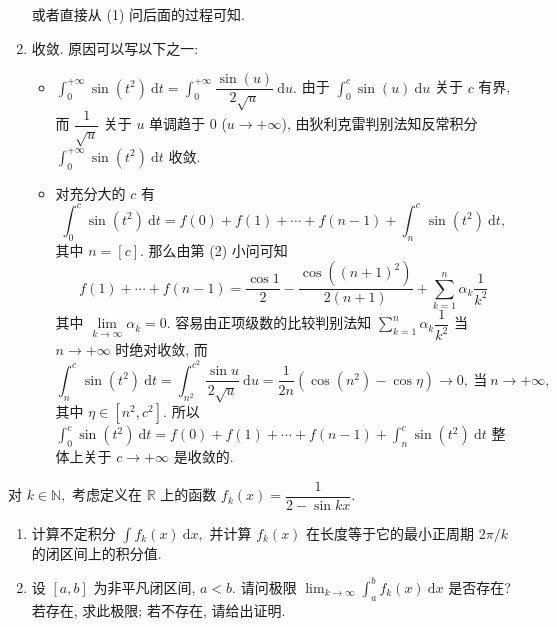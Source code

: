 \begin{solution}
\begin{enumerate}
或者直接从 (1) 问后面的过程可知.

\item 收敛. 原因可以写以下之一:
\begin{itemize}
\item[\ding{43}] $\displaystyle \int_0^{+\infty} \sin(t^2) ~ \mathrm{d}t = \int_0^{+\infty} \dfrac{\sin(u)}{2\sqrt{u}} ~ \mathrm{d}u.$ 由于 $\displaystyle \int_0^c \sin(u) ~ \mathrm{d}u$ 关于 $c$ 有界, 而 $\dfrac{1}{\sqrt{u}}$ 关于 $u$ 单调趋于 $0$ ($u \to + \infty$), 由狄利克雷判别法知反常积分 $\displaystyle \int_0^{+\infty} \sin(t^2) ~ \mathrm{d}t$ 收敛.

\item[\ding{43}] 对充分大的 $c$ 有
$$\int_0^c \sin(t^2) ~ \mathrm{d}t = f(0) + f(1) + \cdots + f(n-1) + \int_n^c \sin(t^2) ~ \mathrm{d}t,$$
其中 $n = [c].$ 那么由第 (2) 小问可知
\begin{equation*}
f(1) + \cdots + f(n-1) = \dfrac{\cos 1}{2} - \dfrac{\cos((n+1)^2)}{2(n+1)} + \sum_{k=1}^n \alpha_k \dfrac{1}{k^2}
\end{equation*}
其中 $\lim\limits_{k \to \infty} \alpha_k = 0.$ 容易由正项级数的比较判别法知 $\sum\limits_{k=1}^n \alpha_k \dfrac{1}{k^2}$ 当 $n \to +\infty$ 时绝对收敛, 而
\begin{equation*}
\int_n^c \sin(t^2) ~ \mathrm{d}t = \int_{n^2}^{c^2} \dfrac{\sin u}{2\sqrt{u}} ~ \mathrm{d} u = \dfrac{1}{2n} ( \cos (n^2) - \cos \eta) \to 0, ~ \text{当} ~ n \to +\infty,
\end{equation*}
其中 $\eta \in [n^2, c^2].$ 所以 $\displaystyle \int_0^c \sin(t^2) ~ \mathrm{d}t = f(0) + f(1) + \cdots + f(n-1) + \int_n^c \sin(t^2) ~ \mathrm{d}t$ 整体上关于 $c \to +\infty$ 是收敛的.
\end{itemize}
\end{enumerate}
\end{solution}


\begin{question}[points = 12]
对 $k \in \mathbb{N},$ 考虑定义在 $\mathbb{R}$ 上的函数 $\displaystyle f_k(x) = \dfrac{1}{2 - \sin kx}.$
\begin{enumerate}
\item 计算不定积分 $\displaystyle \int f_k(x) ~ \mathrm{d} x,$ 并计算 $f_k(x)$ 在长度等于它的最小正周期 $2\pi/k$ 的闭区间上的积分值.
\item 设 $[a, b]$ 为非平凡闭区间, $a < b.$ 请问极限 $\displaystyle \lim_{k\to\infty} \int_a^b f_k(x) ~ \mathrm{d} x$ 是否存在? 若存在, 求此极限; 若不存在, 请给出证明.
\end{enumerate}

\end{question}


